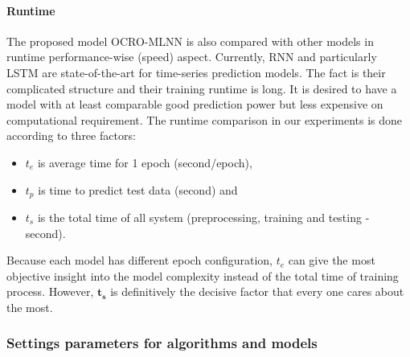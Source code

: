 \documentclass[review,3p,authoryear]{elsarticle}
\def \GN#1{\textcolor{tn_orange}{~#1}}			%
\begin{document}
\paragraph{\textbf{Runtime}} 
The proposed model OCRO-MLNN is also compared with other models in runtime performance-wise (speed) aspect.  
Currently, RNN and particularly LSTM are state-of-the-art for time-series prediction models. The fact is their complicated structure 
and their training runtime is long. It is desired to have a model with at least comparable good prediction power but less expensive on computational requirement. 
The runtime comparison in our experiments is done according to three factors: 
\begin{itemize}
	\item $t_e$ is average time for 1 epoch (second/epoch), 
	\item $t_p$ is time to predict test data (second) and 
	\item $t_s$ is the total time of all system (preprocessing, training and testing - second). 
\end {itemize}
Because each model has different epoch configuration, $t_e$ can give the most objective insight into the model complexity instead of the total time of training process. However, $\boldsymbol{t_s}$ is definitively the decisive factor that every one cares about the most. 


\subsubsection{Settings parameters for algorithms and models }
\label{para_settings}
\end{document}
